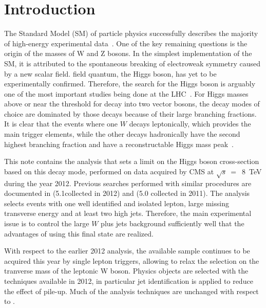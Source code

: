 \section{Introduction}
\label{sec:intro}

The Standard Model (SM) of particle physics successfully describes the
majority of high-energy experimental data~\cite{pdg}. One of the key
remaining questions is the origin of the masses of W and Z bosons.  In
the simplest implementation of the SM, it is attributed to the
spontaneous breaking of electroweak symmetry caused by a new scalar
field. %
field quantum, the Higgs boson, has yet to be experimentally
confirmed.  Therefore, the search for the Higgs boson is arguably one
of the most important studies being done at the
LHC~\cite{lhcmachine}. For Higgs masses above or near the threshold
for decay into two vector bosons, the decay modes of choice are
dominated by those decays because of their large branching fractions.
It is clear that the events where one $W$ decays leptonically, which
provides the main trigger elements, while the other decays
hadronically have the second highest branching fraction and have a
reconstructable Higgs mass peak~\cite{intro2}.

This note contains the analysis that sets a limit on the Higgs boson
cross-section based on this decay mode, performed on data acquired by
CMS at $\sqrt{s}~=$~8~TeV during the year 2012. Previous searches
performed with similar procedures are documented in \cite{HIG-12-021}
(5.1\fbinv collected in 2012) and \cite{HIG-12-003} (5.0\fbinv
collected in 2011).  The analysis selects events with one well
identified and isolated lepton, large missing transverse energy and at
least two high \pt jets.  Therefore, the main experimental issue is to
control the large $W$ plus jets background sufficiently well that the
advantages of using this final state are realized.

With respect to the earlier 2012 analysis, the available sample
continues to be acquired this year by single lepton triggers, allowing
to relax the selection on the tranverse mass of the leptonic W boson.
Physics objects are selected with the techniques available in 2012, in
particular jet identification is applied to reduce the effect of
pile-up. Much of the analysis techniques are unchanged with respect to
\cite{HIG-12-021}.

